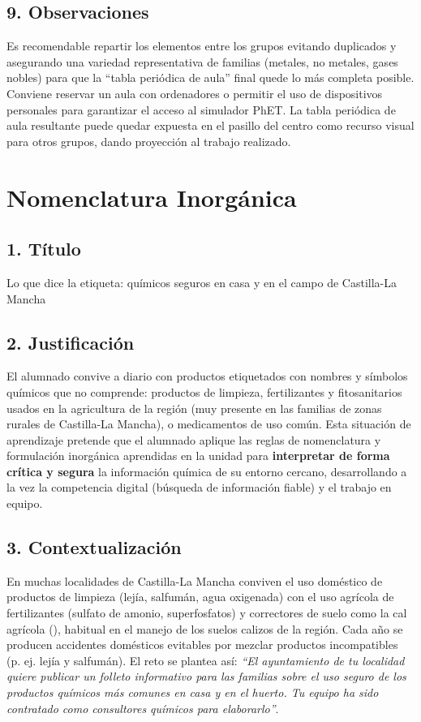 \documentclass[11pt,a4paper]{article}
\begin{document}
\subsection*{9. Observaciones}
Es recomendable repartir los elementos entre los grupos evitando duplicados y asegurando una variedad representativa de familias (metales, no metales, gases nobles) para que la ``tabla periódica de aula'' final quede lo más completa posible. Conviene reservar un aula con ordenadores o permitir el uso de dispositivos personales para garantizar el acceso al simulador PhET. La tabla periódica de aula resultante puede quedar expuesta en el pasillo del centro como recurso visual para otros grupos, dando proyección al trabajo realizado.

\newpage
\section{Nomenclatura Inorgánica}
\subsection*{1. Título}
Lo que dice la etiqueta: químicos seguros en casa y en el campo de Castilla-La Mancha

\subsection*{2. Justificación}
El alumnado convive a diario con productos etiquetados con nombres y símbolos químicos que no comprende: productos de limpieza, fertilizantes y fitosanitarios usados en la agricultura de la región (muy presente en las familias de zonas rurales de Castilla-La Mancha), o medicamentos de uso común. Esta situación de aprendizaje pretende que el alumnado aplique las reglas de nomenclatura y formulación inorgánica aprendidas en la unidad para \textbf{interpretar de forma crítica y segura} la información química de su entorno cercano, desarrollando a la vez la competencia digital (búsqueda de información fiable) y el trabajo en equipo.

\subsection*{3. Contextualización}
En muchas localidades de Castilla-La Mancha conviven el uso doméstico de productos de limpieza (lejía, salfumán, agua oxigenada) con el uso agrícola de fertilizantes (sulfato de amonio, superfosfatos) y correctores de suelo como la cal agrícola (), habitual en el manejo de los suelos calizos de la región. Cada año se producen accidentes domésticos evitables por mezclar productos incompatibles (p. ej. lejía y salfumán). El reto se plantea así: \textit{``El ayuntamiento de tu localidad quiere publicar un folleto informativo para las familias sobre el uso seguro de los productos químicos más comunes en casa y en el huerto. Tu equipo ha sido contratado como consultores químicos para elaborarlo''}.
\end{document}
